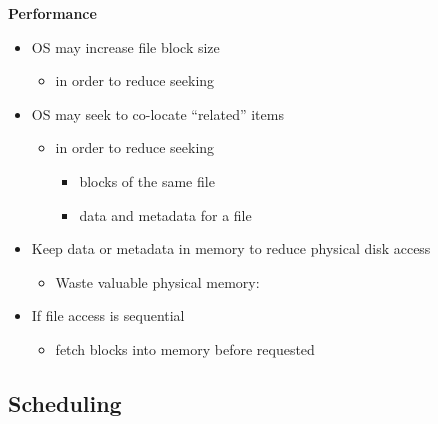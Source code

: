 \documentclass[11pt,a4paper]{article}
\begin{document}
\textbf{Performance}
\begin{itemize}
    \item OS may increase file block size
        \begin{itemize}
            \item in order to reduce seeking
        \end{itemize}
    \item OS may seek to co-locate ``related'' items
        \begin{itemize}
            \item in order to reduce seeking
                \begin{itemize}
                    \item blocks of the same file
                    \item data and metadata for a file
                \end{itemize}
        \end{itemize}
    \item Keep data or metadata in memory to reduce physical disk access
        \begin{itemize}
            \item Waste valuable physical memory:
        \end{itemize}
    \item If file access is sequential
        \begin{itemize}
            \item fetch blocks into memory before requested
        \end{itemize}
\end{itemize}

\subsection{Scheduling}
\end{document}
